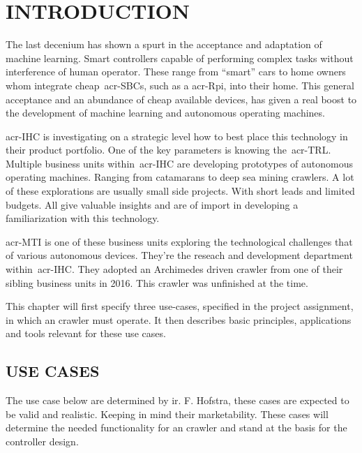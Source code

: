 

\chapter{INTRODUCTION}\label{chap:introduction}

The last decenium has shown a spurt in the acceptance and adaptation of machine learning. Smart controllers
capable of performing complex tasks without interference of human operator. These range from ``smart'' cars to home
owners whom integrate cheap~\glspl{acr-SBC}, such as a \gls{acr-Rpi}, into their home. This general acceptance and an
abundance of cheap available devices, has given a real boost to the development of machine learning and autonomous 
operating machines.

\gls{acr-IHC} is investigating on a strategic level how to best place this technology in their product portfolio. One
of the key parameters is knowing the~\gls{acr-TRL}. Multiple business units within~\gls{acr-IHC} are developing
prototypes of autonomous operating machines. Ranging from catamarans to deep sea mining crawlers. A lot of these 
explorations are usually small side projects. With short leads and limited budgets. All give valuable insights 
and are of import in developing a familiarization with this technology.

\gls{acr-MTI} is one of these business units exploring the technological challenges that of various autonomous devices.
They're the reseach and development department within~\gls{acr-IHC}. They adopted an Archimedes driven crawler from 
one of their sibling business units in 2016. This crawler was unfinished at the time.

This chapter will first specify three use-cases, specified in the project assignment, in which an crawler must 
operate. It then describes basic principles, applications and tools relevant for these use cases.


\section{USE CASES}\label{sec:usecases}
The use case below are determined by ir. F. Hofstra, these cases are expected to be valid and realistic. Keeping in 
mind their marketability. These cases will determine the needed functionality for an crawler and stand at the basis 
for the controller design.

